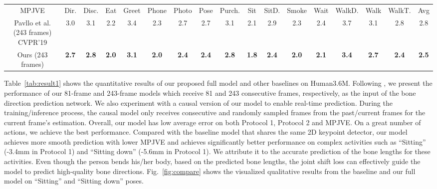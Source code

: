 \documentclass[journal]{IEEEtran}
\begin{document}
\begin{table*}[htbp]
\begin{threeparttable}
{\begin{tabular}{|c|c|c|c|c|c|c|c|c|c|c|c|c|c|c|c|c|}
    MPJVE&Dir.&Disc.&Eat&Greet&Phone&Photo&Pose&Purch.&Sit&SitD.&Smoke&Wait&WalkD.&Walk&WalkT.&Avg \\
    
    
    Pavllo et al. \cite{pavllo20193d} (243 frames) CVPR'19 &3.0 &3.1 &2.2 &3.4 &2.3 &2.7 &2.7 &3.1 &2.1 &2.9 &2.3 &2.4 &3.7 &3.1 &2.8 &2.8\\
    Ours (243 frames) &\textbf{2.7}&\textbf{2.8}&\textbf{2.0}&\textbf{3.1}&\textbf{2.0}&\textbf{2.4}&\textbf{2.4}&\textbf{2.8}&\textbf{1.8}&\textbf{2.4}&\textbf{2.0}&\textbf{2.1}&\textbf{3.4}&\textbf{2.7}&\textbf{2.4}&\textbf{2.5}\\ \cline{1-17}
    

    \end{tabular}}\end{threeparttable}
  
  \vspace{-1mm}
\end{table*}\vspace{-0mm}

Table~\ref{tab:result1} shows the quantitative results of our proposed full model and other baselines on Human3.6M. Following  \cite{pavllo20193d}, we present the performance of our 81-frame and 243-frame models which receive 81 and 243 consecutive frames, respectively, as the input of the bone direction prediction network. We also experiment with a causal version of our model to enable real-time prediction. During the training/inference process, the causal model only receives  consecutive and  randomly sampled frames from the past/current frames for the current frame's estimation. Overall, our model has low average error on both Protocol 1, Protocol 2 and MPJVE. On a great number of actions, we achieve the best performance. Compared with the baseline model  \cite{pavllo20193d} that shares the same 2D keypoint detector, our model achieves more smooth prediction with lower MPJVE and achieves significantly better performance on complex activities such as ``Sitting'' (-3.4mm in Protocol 1) and ``Sitting down'' (-5.6mm in Protocol 1). We attribute it to the accurate prediction of the bone lengths for these activities. Even though the person bends his/her body, based on the predicted bone lengths, the joint shift loss can effectively guide the model to predict high-quality bone directions. Fig.~\ref{fig:compare} shows the visualized qualitative results from the baseline and our full model on ``Sitting'' and ``Sitting down'' poses. 
\end{document}
